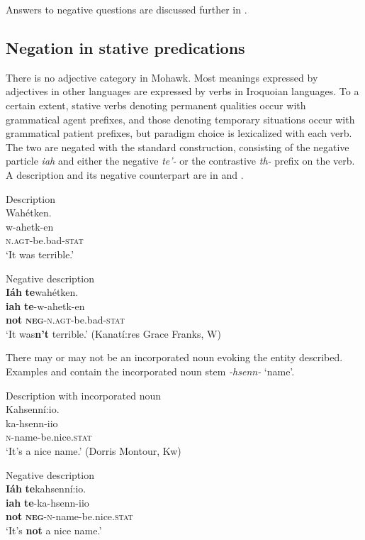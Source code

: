 \documentclass[output=paper,colorlinks,citecolor=brown]{langscibook}
\begin{document}
Answers to negative questions are discussed further in .

\subsection{Negation in stative predications}\label{sec:moh:2.3}

There is no adjective category in Mohawk. Most meanings expressed by adjectives in other languages are expressed by verbs in Iroquoian languages. To a certain extent, stative verbs denoting permanent qualities occur with grammatical agent prefixes, and those denoting temporary situations occur with grammatical patient prefixes, but paradigm choice is lexicalized with each verb. The two are negated with the standard construction, consisting of the negative particle \textit{iah} and either the negative \textit{te’-} or the contrastive \textit{th-} prefix on the verb. A description and its negative counterpart are in  and .

\ea\label{ex:moh:39}Description\\
    \glll Wahétken.\\
         w-ahetk-en\\
         \textsc{n.agt}-be.bad-\textsc{stat} \\
    \glt ‘It was terrible.’
\z

\ea\label{ex:moh:40} Negative description\\
    \glll \textbf{Iáh} \textbf{te}wahétken.\\
         \textbf{iah} \textbf{te}-w-ahetk-en\\
         \textbf{not} \textbf{\textsc{neg}}\textsc{-n.agt}-be.bad-\textsc{stat}\\
    \glt ‘It was\textbf{n’t} terrible.’ (Kanatí:res Grace Franks, W)
\z

There may or may not be an incorporated noun evoking the entity described. Examples  and  contain the incorporated noun stem \textit{{}-hsenn-} ‘name’.

\ea\label{ex:moh:41}Description with incorporated noun\\
    \glll Kahsenní:io. \\
         ka-hsenn-iio\\
         \textsc{n}-name-be.nice.\textsc{stat}\\
    \glt ‘It’s a nice name.’ (Dorris Montour, Kw)
\z

\ea\label{ex:moh:42}Negative description\\
    \glll \textbf{Iáh} \textbf{te}kahsenní:io.\\
         \textbf{iah} \textbf{te}-ka-hsenn-iio\\
         \textbf{not} \textsc{\textbf{neg}-n-}name-be.nice.\textsc{stat}\\
    \glt ‘It’s \textbf{not} a nice name.’
\z
\end{document}
